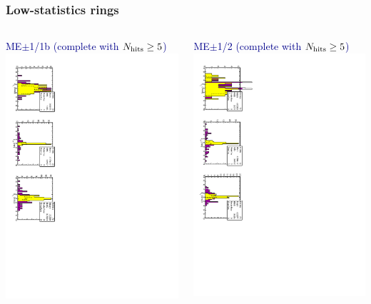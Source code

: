 \documentclass[compress]{beamer}
\begin{document}
\begin{frame}
\frametitle{Low-statistics rings}

\vfill
\begin{columns}
\textcolor{darkblue}{ME$\pm$1/1b (complete with $N_{\mbox{\scriptsize hits}} \ge 5$)}
\includegraphics[height=\linewidth, angle=90]{alignall_me11b.pdf}

\vspace{0.2 cm}
\textcolor{darkblue}{ME$\pm$1/2 (complete with $N_{\mbox{\scriptsize hits}} \ge 5$)}
\includegraphics[height=\linewidth, angle=90]{alignall_me12.pdf}


\end{columns}
\end{frame}
\end{document}
